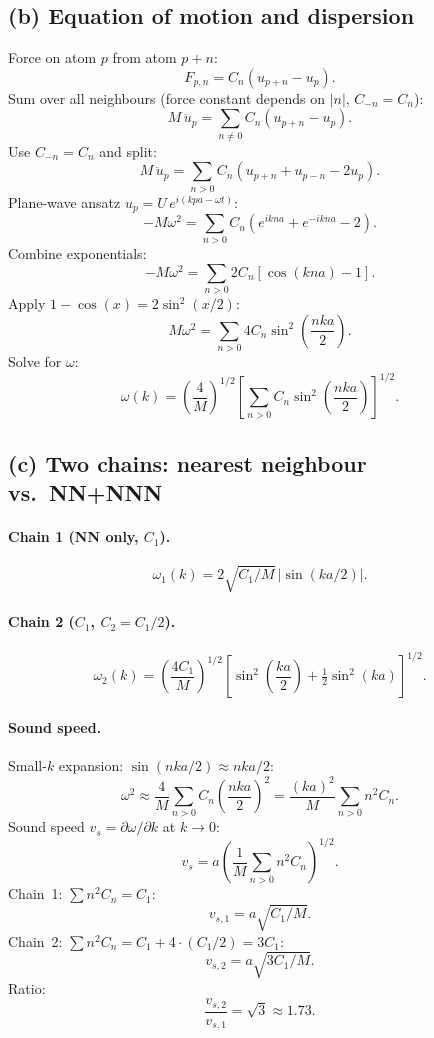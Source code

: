 \documentclass[11pt]{article}
\begin{document}
\subsection*{(b) Equation of motion and dispersion}

Force on atom $p$ from atom $p+n$:
\[
F_{p,n} = C_{n}(u_{p+n}-u_{p}).
\]
Sum over all neighbours (force constant depends on $|n|$, $C_{-n}=C_{n}$):
\[
M\,\ddot u_{p} = \sum_{n\neq 0} C_{n}(u_{p+n}-u_{p}).
\]
Use $C_{-n}=C_{n}$ and split:
\[
M\,\ddot u_{p} = \sum_{n>0} C_{n}\!\left(u_{p+n}+u_{p-n}-2u_{p}\right).
\]
Plane-wave ansatz $u_{p} = U\,e^{i(kpa-\omega t)}$:
\[
-M\omega^{2} = \sum_{n>0} C_{n}\!\left(e^{ikna}+e^{-ikna}-2\right).
\]
Combine exponentials:
\[
-M\omega^{2} = \sum_{n>0} 2C_{n}\!\left[\cos(kna)-1\right].
\]
Apply $1-\cos(x) = 2\sin^{2}(x/2)$:
\[
M\omega^{2} = \sum_{n>0} 4C_{n}\sin^{2}\!\left(\frac{nka}{2}\right).
\]
Solve for $\omega$:
\[
\boxed{\;\omega(k) = \!\left(\frac{4}{M}\right)^{\!1/2}\!\left[\sum_{n>0}C_{n}\sin^{2}\!\left(\frac{nka}{2}\right)\right]^{1/2}.\;}
\]

\subsection*{(c) Two chains: nearest neighbour vs.\ NN+NNN}

\paragraph{Chain 1 (NN only, $C_{1}$).}
\[
\omega_{1}(k) = 2\sqrt{C_{1}/M}\,\bigl|\sin(ka/2)\bigr|.
\]

\paragraph{Chain 2 ($C_{1}$, $C_{2}=C_{1}/2$).}
\[
\omega_{2}(k) = \!\left(\frac{4 C_{1}}{M}\right)^{\!1/2}\!\left[\sin^{2}\!\left(\frac{ka}{2}\right)+\tfrac12\sin^{2}(ka)\right]^{1/2}.
\]

\paragraph{Sound speed.} Small-$k$ expansion: $\sin(nka/2)\approx nka/2$:
\[
\omega^{2} \approx \frac{4}{M}\sum_{n>0}C_{n}\!\left(\frac{nka}{2}\right)^{2} = \frac{(ka)^{2}}{M}\sum_{n>0}n^{2}C_{n}.
\]
Sound speed $v_{s}=\partial\omega/\partial k$ at $k\to 0$:
\[
v_{s} = a\!\left(\frac{1}{M}\sum_{n>0}n^{2}C_{n}\right)^{\!1/2}.
\]
Chain~1: $\sum n^{2}C_{n}=C_{1}$:
\[
v_{s,1} = a\sqrt{C_{1}/M}.
\]
Chain~2: $\sum n^{2}C_{n}=C_{1}+4\cdot(C_{1}/2)=3C_{1}$:
\[
v_{s,2} = a\sqrt{3C_{1}/M}.
\]
Ratio:
\[
\boxed{\;\frac{v_{s,2}}{v_{s,1}} = \sqrt{3}\approx 1.73.\;}
\]
\end{document}
